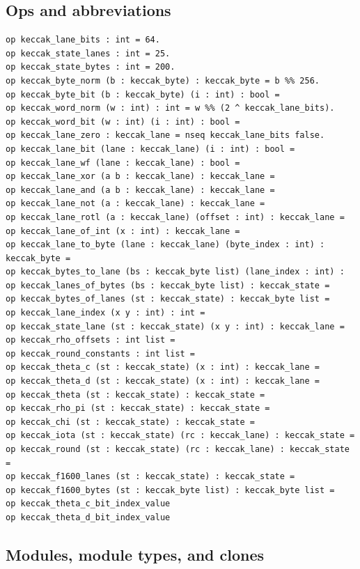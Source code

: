 \subsection*{Ops and abbreviations}
\begin{lstlisting}[language=EasyCrypt,basicstyle=\ttfamily\tiny]
op keccak_lane_bits : int = 64.
op keccak_state_lanes : int = 25.
op keccak_state_bytes : int = 200.
op keccak_byte_norm (b : keccak_byte) : keccak_byte = b %% 256.
op keccak_byte_bit (b : keccak_byte) (i : int) : bool =
op keccak_word_norm (w : int) : int = w %% (2 ^ keccak_lane_bits).
op keccak_word_bit (w : int) (i : int) : bool =
op keccak_lane_zero : keccak_lane = nseq keccak_lane_bits false.
op keccak_lane_bit (lane : keccak_lane) (i : int) : bool =
op keccak_lane_wf (lane : keccak_lane) : bool =
op keccak_lane_xor (a b : keccak_lane) : keccak_lane =
op keccak_lane_and (a b : keccak_lane) : keccak_lane =
op keccak_lane_not (a : keccak_lane) : keccak_lane =
op keccak_lane_rotl (a : keccak_lane) (offset : int) : keccak_lane =
op keccak_lane_of_int (x : int) : keccak_lane =
op keccak_lane_to_byte (lane : keccak_lane) (byte_index : int) : keccak_byte =
op keccak_bytes_to_lane (bs : keccak_byte list) (lane_index : int) :
op keccak_lanes_of_bytes (bs : keccak_byte list) : keccak_state =
op keccak_bytes_of_lanes (st : keccak_state) : keccak_byte list =
op keccak_lane_index (x y : int) : int =
op keccak_state_lane (st : keccak_state) (x y : int) : keccak_lane =
op keccak_rho_offsets : int list =
op keccak_round_constants : int list =
op keccak_theta_c (st : keccak_state) (x : int) : keccak_lane =
op keccak_theta_d (st : keccak_state) (x : int) : keccak_lane =
op keccak_theta (st : keccak_state) : keccak_state =
op keccak_rho_pi (st : keccak_state) : keccak_state =
op keccak_chi (st : keccak_state) : keccak_state =
op keccak_iota (st : keccak_state) (rc : keccak_lane) : keccak_state =
op keccak_round (st : keccak_state) (rc : keccak_lane) : keccak_state =
op keccak_f1600_lanes (st : keccak_state) : keccak_state =
op keccak_f1600_bytes (st : keccak_byte list) : keccak_byte list =
op keccak_theta_c_bit_index_value
op keccak_theta_d_bit_index_value
\end{lstlisting}

\subsection*{Modules, module types, and clones}
\begin{lstlisting}[language=EasyCrypt,basicstyle=\ttfamily\tiny]
\end{lstlisting}

